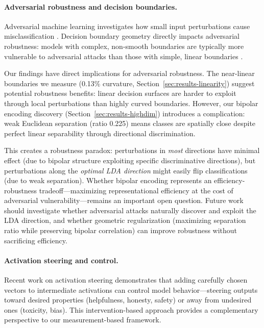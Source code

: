 \documentclass[11pt]{article}
\begin{document}
\paragraph{Adversarial robustness and decision boundaries.}
Adversarial machine learning investigates how small input perturbations cause misclassification \citep{goodfellow2014explaining}. Decision boundary geometry directly impacts adversarial robustness: models with complex, non-smooth boundaries are typically more vulnerable to adversarial attacks than those with simple, linear boundaries \citep{moosavi2019robustness}.

Our findings have direct implications for adversarial robustness. The near-linear boundaries we measure (0.13\% curvature, Section~\ref{sec:results-linearity}) suggest potential robustness benefits: linear decision surfaces are harder to exploit through local perturbations than highly curved boundaries. However, our bipolar encoding discovery (Section~\ref{sec:results-highdim}) introduces a complication: weak Euclidean separation (ratio 0.225) means classes are spatially close despite perfect linear separability through directional discrimination.

This creates a robustness paradox: perturbations in \textit{most} directions have minimal effect (due to bipolar structure exploiting specific discriminative directions), but perturbations along the \textit{optimal LDA direction} might easily flip classifications (due to weak separation). Whether bipolar encoding represents an efficiency-robustness tradeoff---maximizing representational efficiency at the cost of adversarial vulnerability---remains an important open question. Future work should investigate whether adversarial attacks naturally discover and exploit the LDA direction, and whether geometric regularization (maximizing separation ratio while preserving bipolar correlation) can improve robustness without sacrificing efficiency.

\paragraph{Activation steering and control.}
Recent work on activation steering \citep{turner2023activation} demonstrates that adding carefully chosen vectors to intermediate activations can control model behavior---steering outputs toward desired properties (helpfulness, honesty, safety) or away from undesired ones (toxicity, bias). This intervention-based approach provides a complementary perspective to our measurement-based framework.
\end{document}

